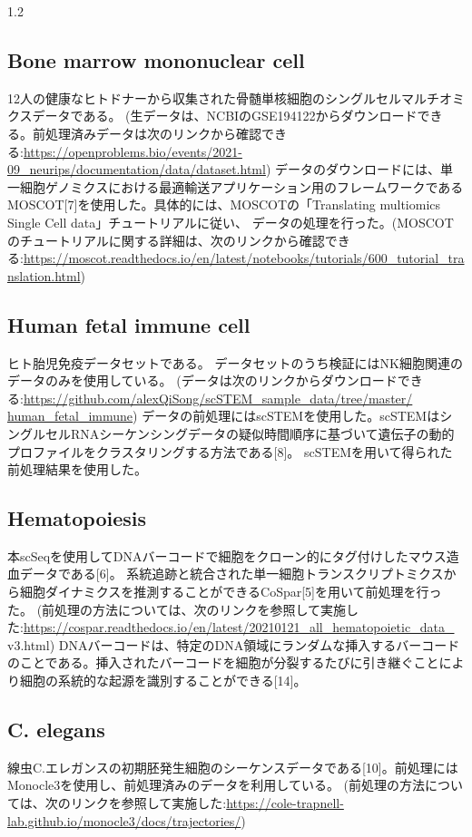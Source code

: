 \documentclass[dvipdfmx,11pt]{kuisthesis}
\begin{document}
\begin{spacing}{1.2}
\subsection{Bone marrow mononuclear cell}\label{data-12}
12人の健康なヒトドナーから収集された骨髄単核細胞のシングルセルマルチオミクスデータである。
(生データは、NCBIのGSE194122からダウンロードできる。前処理済みデータは次のリンクから確認できる:\url{https://openproblems.bio/events/2021-09_neurips/documentation/data/dataset.html})
データのダウンロードには、単一細胞ゲノミクスにおける最適輸送アプリケーション用のフレームワークであるMOSCOT[7]を使用した。具体的には、MOSCOTの「Translating multiomics Single Cell data」チュートリアルに従い、
データの処理を行った。(MOSCOTのチュートリアルに関する詳細は、次のリンクから確認できる:\url{https://moscot.readthedocs.io/en/latest/notebooks/tutorials/600_tutorial_translation.html})

\subsection{Human fetal immune cell}\label{data-13}
ヒト胎児免疫データセットである。
データセットのうち検証にはNK細胞関連のデータのみを使用している。
(データは次のリンクからダウンロードできる:\url{https://github.com/alexQiSong/scSTEM_sample_data/tree/master/}\\\url{human_fetal_immune})
データの前処理にはscSTEMを使用した。scSTEMはシングルセルRNAシーケンシングデータの疑似時間順序に基づいて遺伝子の動的プロファイルをクラスタリングする方法である[8]。
scSTEMを用いて得られた前処理結果を使用した。

\subsection{Hematopoiesis}\label{data-14}
本scSeqを使用してDNAバーコードで細胞をクローン的にタグ付けしたマウス造血データである[6]。
系統追跡と統合された単一細胞トランスクリプトミクスから細胞ダイナミクスを推測することができるCoSpar[5]を用いて前処理を行った。
(前処理の方法については、次のリンクを参照して実施した:\url{https://cospar.readthedocs.io/en/latest/20210121_all_hematopoietic_data_}\\v3.html)
DNAバーコードは、特定のDNA領域にランダムな挿入するバーコードのことである。挿入されたバーコードを細胞が分裂するたびに引き継ぐことにより細胞の系統的な起源を識別することができる[14]。

\subsection{C. elegans}\label{data-16}
線虫C.エレガンスの初期胚発生細胞のシーケンスデータである[10]。前処理にはMonocle3を使用し、前処理済みのデータを利用している。
(前処理の方法については、次のリンクを参照して実施した:\url{https://cole-trapnell-lab.github.io/monocle3/docs/trajectories/})


\end{spacing}
\end{document}
